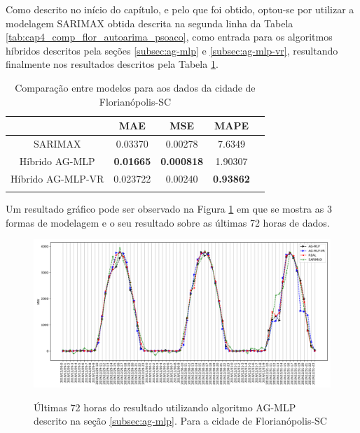Como descrito no início do capítulo, e pelo que foi obtido, optou-se por utilizar a modelagem SARIMAX obtida descrita na segunda linha da Tabela \ref{tab:cap4_comp_flor_autoarima_psoaco}, como entrada para os algoritmos híbridos descritos pela seções \ref{subsec:ag-mlp} e \ref{subsec:ag-mlp-vr}, resultando finalmente nos resultados descritos pela Tabela \ref{tab:cap4_comp_flor_agmlp_agmlpvr}.

\begin{table}[htbp]
\caption{Comparação entre modelos para aos dados da cidade de Florianópolis-SC}
\begin{center}
\begin{tabular}{ccccc}
                & MAE & MSE & MAPE \\\hline
SARIMAX         & 0.03370 & 0.00278 & 7.6349 \\\hline
Híbrido AG-MLP  & \textbf{0.01665} & \textbf{0.000818} & 1.90307 \\\hline
Híbrido AG-MLP-VR & 0.023722 & 0.00240 & \textbf{0.93862} \\\hline
\label{tab:cap4_comp_flor_agmlp_agmlpvr}
\end{tabular}
\end{center}
\end{table}

Um resultado gráfico pode ser observado na Figura \ref{fig:cap4_flor_3_days_hibrids} em que se mostra as 3 formas de modelagem e o seu resultado sobre as últimas 72 horas de dados.

\begin{figure}[!htbp]
    \centering
    \caption{Últimas 72 horas do resultado utilizando algoritmo AG-MLP descrito na seção \ref{subsec:ag-mlp}. Para a cidade de Florianópolis-SC}
    \includegraphics[width=\textwidth]{Figuras/cap4/comparison_hibrids_fl.png}
    \label{fig:cap4_flor_3_days_hibrids}
\end{figure}